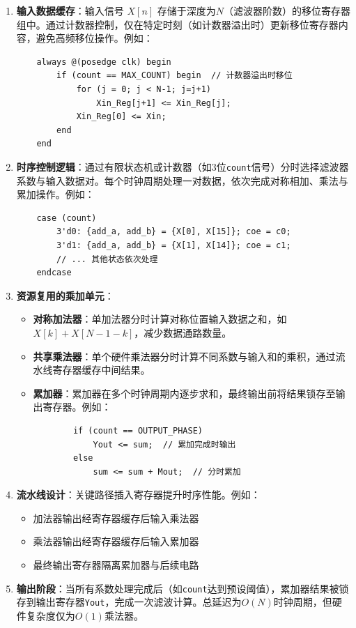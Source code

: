 \begin{enumerate}
    \item \textbf{输入数据缓存}：输入信号 \( X[n] \) 存储于深度为\( N \)（滤波器阶数）的移位寄存器组中。通过计数器控制，仅在特定时刻（如计数器溢出时）更新移位寄存器内容，避免高频移位操作。例如：
    \begin{verbatim}
    always @(posedge clk) begin
        if (count == MAX_COUNT) begin  // 计数器溢出时移位
            for (j = 0; j < N-1; j=j+1)
                Xin_Reg[j+1] <= Xin_Reg[j];
            Xin_Reg[0] <= Xin;
        end
    end
  \end{verbatim}

    \item \textbf{时序控制逻辑}：通过有限状态机或计数器（如3位\texttt{count}信号）分时选择滤波器系数与输入数据对。每个时钟周期处理一对数据，依次完成对称相加、乘法与累加操作。例如：
    \begin{verbatim}
    case (count)
        3'd0: {add_a, add_b} = {X[0], X[15]}; coe = c0;
        3'd1: {add_a, add_b} = {X[1], X[14]}; coe = c1;
        // ... 其他状态依次处理
    endcase
  \end{verbatim}

    \item \textbf{资源复用的乘加单元}：
    \begin{itemize}
        \item \textbf{对称加法器}：单加法器分时计算对称位置输入数据之和，如 \( X[k] + X[N-1-k] \)，减少数据通路数量。
        \item \textbf{共享乘法器}：单个硬件乘法器分时计算不同系数与输入和的乘积，通过流水线寄存器缓存中间结果。
        \item \textbf{累加器}：累加器在多个时钟周期内逐步求和，最终输出前将结果锁存至输出寄存器。例如：
        \begin{verbatim}
        if (count == OUTPUT_PHASE) 
            Yout <= sum;  // 累加完成时输出
        else 
            sum <= sum + Mout;  // 分时累加
        \end{verbatim}
    \end{itemize}

    \item \textbf{流水线设计}：关键路径插入寄存器提升时序性能。例如：
    \begin{itemize}
        \item 加法器输出经寄存器缓存后输入乘法器
        \item 乘法器输出经寄存器缓存后输入累加器
        \item 最终输出寄存器隔离累加器与后续电路
    \end{itemize}

    \item \textbf{输出阶段}：当所有系数处理完成后（如\texttt{count}达到预设阈值），累加器结果被锁存到输出寄存器\texttt{Yout}，完成一次滤波计算。总延迟为\( O(N) \)时钟周期，但硬件复杂度仅为\( O(1) \)乘法器。
\end{enumerate}

